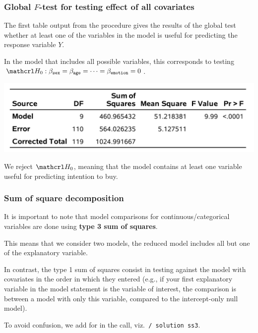 \documentclass{beamer}
\begin{document}
\begin{frame}[fragile]
\frametitle{Global $F$-test for testing effect of all covariates}
\bi
\item The first table output from the \SASlang {} procedure gives the results of the global test whether at least one of the variables in the model is useful for predicting the response variable $Y$.
\item In the model that includes all possible variables, this corresponds to testing $\Hy_0:  \beta_{\code{sex}}=\beta_{\code{age}}=\cdots =\beta_{\code{emotion}}=0$.
\begin{center}
\includegraphics[width = 0.7\linewidth]{img/c2/slides3-e12}
\end{center}
\item We reject $\Hy_0$, meaning that the model contains at least one variable useful for predicting intention to buy.
\ei
\end{frame}
\begin{frame}[fragile]
\frametitle{Sum of square decomposition}
 \bi \item It is important to note that model comparisons for continuous/categorical variables are done using \textbf{type 3 sum of squares}.
 \bi \item This means that we consider two models, the reduced model includes all but one of the explanatory variable.
 \ei \item In contrast, the type 1 sum of squares consist in testing against the model with covariates in the order in which they entered (e.g., if your first explanatory variable in the model statement is the variable of interest, the comparison is between a model with only this variable, compared to the intercept-only null model).
 \item To avoid confusion, we add for  in the \SASlang call, viz.\verb+ / solution ss3+.
 \ei 
\end{frame}
\end{document}

